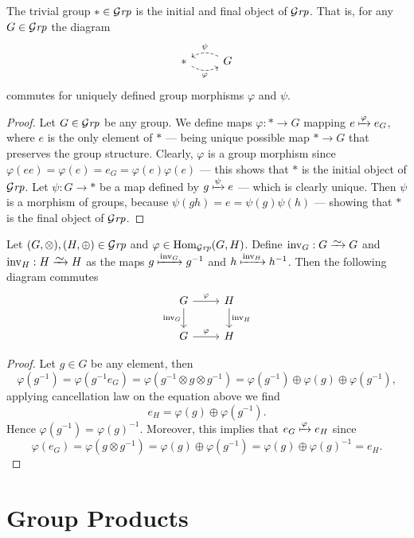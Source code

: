 \begin{proposition}
  The trivial group \(* \in {\mathcal{G}\textit{rp}}\) is the initial and final object of \({\mathcal{G}\textit{rp}}\).
  That is, for any \(G \in {\mathcal{G}\textit{rp}}\) the diagram
  \[
    \begin{tikzcd}
      * \ar[r, dashed, bend right, swap, "\varphi"]
      &G \ar[l, dashed, bend right, swap, "\psi"]
    \end{tikzcd}
  \]
  commutes for uniquely defined group morphisms \(\varphi\) and \(\psi\).
\end{proposition}

\begin{proof}
  Let \(G \in {\mathcal{G}\textit{rp}}\) be any group. We define maps \(\varphi: * \to G\) mapping
  \(e \xmapsto\varphi e_G\), where \(e\) is the only element of \(*\) --- being
  unique possible map \(* \to G\) that preserves the group structure. Clearly,
  \(\varphi\) is a group morphism since \(\varphi(e e) = \varphi(e) = e_G =
  \varphi(e) \varphi(e)\) --- this shows that \(*\) is the initial object of
  \({\mathcal{G}\textit{rp}}\). Let \(\psi: G \to *\) be a map defined by \(g \xmapsto\psi e\) ---
  which is clearly unique. Then \(\psi\) is a morphism of groups, because
  \(\psi(g h) = e = \psi(g) \psi(h)\) --- showing that \(*\) is the final object
  of \({\mathcal{G}\textit{rp}}\).
\end{proof}

\begin{proposition}
  Let \((G, \otimes), (H, \oplus) \in {\mathcal{G}\textit{rp}}\) and \(\varphi \in \operatorname{Hom}_{\mathcal{G}\textit{rp}}(G,
  H)\). Define \(\operatorname{inv}_G: G \isoto G\) and \(\operatorname{inv}_H:
  H \isoto H\) as the maps \(g \xmapsto {\operatorname{inv}_G} g^{-1}\) and \(h
  \xmapsto {\operatorname{inv}_H} h^{-1}\). Then the following diagram commutes
  \[
    \begin{tikzcd}
      G \ar[r, "\varphi"]
      \ar[d, swap, "\operatorname{inv}_G"]
      &H \ar[d, "\operatorname{inv}_H"] \\
      G \ar[r, "\varphi"] &H
    \end{tikzcd}
  \]
\end{proposition}

\begin{proof}
  Let \(g \in G\) be any element, then
  \[
    \varphi(g^{-1}) = \varphi(g^{-1} e_G) = \varphi(g^{-1} \otimes g \otimes
    g^{-1}) = \varphi(g^{-1}) \oplus \varphi(g) \oplus \varphi(g^{-1}),
  \]
  applying cancellation law on the equation above we find
  \[
    e_H = \varphi(g) \oplus \varphi(g^{-1}).
  \]
  Hence \(\varphi(g^{-1}) = \varphi(g)^{-1}\). Moreover, this implies that \(e_G
  \xmapsto \varphi e_H\) since
  \[
    \varphi(e_G) = \varphi(g \otimes g^{-1}) = \varphi(g) \oplus \varphi(g^{-1})
    = \varphi(g) \oplus \varphi(g)^{-1} = e_H.
  \]
\end{proof}

\section{Group Products}

